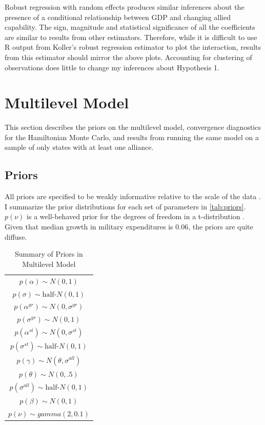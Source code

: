 \documentclass[12pt]{article}
\begin{document}
Robust regression with random effects produces similar inferences about the presence of a conditional relationship between GDP and changing allied capability. 
The sign, magnitude and statistical significance of all the coefficients are similar to results from other estimators. 
Therefore, while it is difficult to use \textsf{R} output from Koller's robust regression estimator to plot the interaction, results from this estimator should mirror the above plots. 
Accounting for clustering of observations does little to change my inferences about Hypothesis 1. 


\section{Multilevel Model}

This section describes the priors on the multilevel model, convergence diagnostics for the Hamiltonian Monte Carlo, and results from running the same model on a sample of only states with at least one alliance. 

\subsection{Priors} 

All priors are specified to be weakly informative relative to the scale of the data \citep{Gelmanetal2017}. 
I summarize the prior distributions for each set of parameters in \autoref{tab:priors}. 
$p(\nu)$ is a well-behaved prior for the degrees of freedom in a t-distribution \citep{JuarezSteele2010}. 
Given that median growth in military expenditures is 0.06, the priors are quite diffuse. 


\begin{table} %
\begin{center}
\begin{tabular}{c} 
$ p(\alpha) \sim N(0, 1)$  \\
$ p(\sigma) \sim \mbox{half-}N(0, 1) $ \\
$ p(\alpha^{yr}) \sim N(0, \sigma^{yr}) $ \\ 
$ p(\sigma^{yr}) \sim N(0, 1) $ \\
$ p(\alpha^{st}) \sim N(0, \sigma^{st}) $ \\ 
$ p(\sigma^{st}) \sim \mbox{half-}N(0, 1) $ \\ 
$ p(\gamma) \sim N(\theta, \sigma^{all}) $ \\ 
$ p(\theta) \sim N(0, .5) $ \\
$ p(\sigma^{all}) \sim \mbox{half-}N(0, 1) $ \\
$ p(\beta) \sim N(0, 1) $ \\
$ p(\nu) \sim gamma(2, 0.1)$ 
\end{tabular} 
\caption{Summary of Priors in Multilevel Model} 
\label{tab:priors}
\end{center} 
\end{table} 
\end{document}
